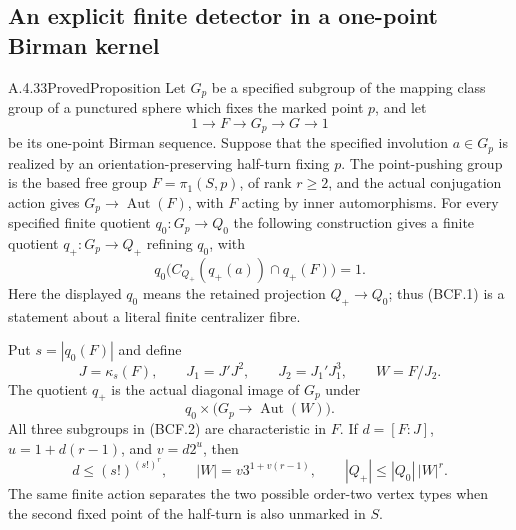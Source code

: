 \subsection{An explicit finite detector in a one-point Birman kernel}

\begin{result}{A.4.33}{Proved}{Proposition}
\label{prop:birman-cyclic-fibre-detector}
Let $G_p$ be a specified subgroup of the mapping class group of
a punctured sphere which fixes the marked point $p$, and let
\[
 1\longrightarrow F\longrightarrow G_p\longrightarrow G
       \longrightarrow1
\]
be its one-point Birman sequence.  Suppose that the specified
involution $a\in G_p$ is realized by an orientation-preserving
half-turn fixing $p$.  The point-pushing group is the based
free group $F=\pi_1(S,p)$, of rank $r\geq2$, and the actual
conjugation action gives $G_p\to\operatorname{Aut}(F)$,
with $F$ acting by inner automorphisms.
For every specified finite quotient $q_0:G_p\to Q_0$ the
following construction gives a finite quotient $q_+:G_p\to Q_+$
refining $q_0$, with
\[
 q_0\bigl(C_{Q_+}(q_+(a))\cap q_+(F)\bigr)=1.          \tag{BCF.1}
\]
Here the displayed $q_0$ means the retained projection
$Q_+\to Q_0$; thus (BCF.1) is a statement about a literal
finite centralizer fibre.

Put $s=|q_0(F)|$ and define
\[
 J=\kappa_s(F),\qquad J_1=J'J^2,\qquad
 J_2=J_1'J_1^3,\qquad W=F/J_2.                         \tag{BCF.2}
\]
The quotient $q_+$ is the actual diagonal image of $G_p$ under
\[
             q_0\times\bigl(G_p\longrightarrow
                                      \operatorname{Aut}(W)\bigr).
                                                               \tag{BCF.3}
\]
All three subgroups in (BCF.2) are characteristic in $F$.
If $d=[F:J]$, $u=1+d(r-1)$, and $v=d2^u$, then
\[
 d\leq(s!)^{(s!)^r},\qquad
 |W|=v3^{1+v(r-1)},\qquad |Q_+|\leq|Q_0|\,|W|^r.     \tag{BCF.4}
\]
The same finite action separates the two possible order-two
vertex types when the second fixed point of the half-turn is
also unmarked in $S$.
\end{result}

